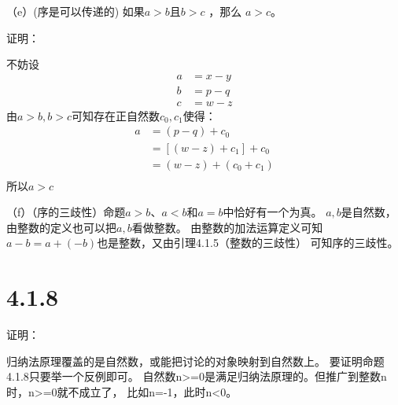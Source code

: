 \documentclass{article}
\theoremstyle{mystyle}
\theoremstyle{zproofstyle}
\begin{document}
（e）(序是可以传递的) 如果$a > b$且$b > c$ ，那么 $a > c$。

证明：

不妨设
\begin{align}
  a & = x - y \\
  b & = p - q \\
  c & = w - z 
\end{align}
由$a>b,b>c$可知存在正自然数$c_0,c_1$使得：
\begin{align*}
  a & = (p - q) + c_0         \\
    & = [(w - z) + c_1] + c_0 \\
    & = (w - z) + (c_0 + c_1) \\
\end{align*}
所以$a > c$

（f）（序的三歧性）命题$a>b$、$a<b$和$a=b$中恰好有一个为真。
$a,b$是自然数，由整数的定义也可以把$a,b$看做整数。
由整数的加法运算定义可知$a-b=a+(-b)$也是整数，又由引理4.1.5（整数的三歧性）
可知序的三歧性。

\section*{4.1.8}

证明：

归纳法原理覆盖的是自然数，或能把讨论的对象映射到自然数上。
要证明命题4.1.8只要举一个反例即可。
自然数n>=0是满足归纳法原理的。但推广到整数n时，n>=0就不成立了，
比如n=-1，此时n<0。
\end{document}
